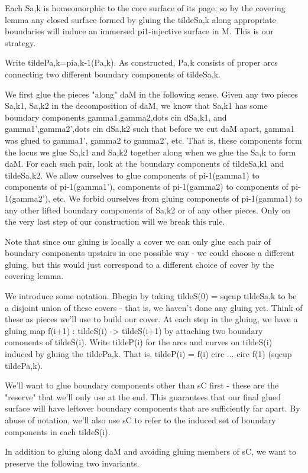\documentclass[12pt]{amsart}
\theoremstyle{definition}
\theoremstyle{remark}
\begin{document}
Each Sa,k is homeomorphic to the core surface of its page, so by the covering
lemma any closed surface formed by gluing the tildeSa,k along appropriate
boundaries will induce an immersed pi1-injective surface in M. This is our
strategy.

Write tildePa,k=pia,k-1(Pa,k). As constructed, Pa,k consists of proper arcs
connecting two different boundary components of tildeSa,k.

We first glue the pieces "along" daM in the following sense. Given any two
pieces Sa,k1, Sa,k2 in the decomposition of daM, we know that Sa,k1 has some
boundary components gamma1,gamma2,dots cin dSa,k1, and gamma1',gamma2',dots cin
dSa,k2 such that before we cut daM apart, gamma1 was glued to gamma1', gamma2
to gamma2', etc.  That is, these components form the locus we glue Sa,k1 and
Sa,k2 together along when we glue the Sa,k to form daM.  For each such pair,
look at the boundary components of tildeSa,k1 and tildeSa,k2.  We allow
ourselves to glue components of pi-1(gamma1) to components of pi-1(gamma1'),
components of pi-1(gamma2) to components of pi-1(gamma2'), etc. We forbid
ourselves from gluing components of pi-1(gamma1) to any other lifted boundary
components of Sa,k2 or of any other pieces. Only on the very last step of our
construction will we break this rule.

Note that since our gluing is locally a cover we can only glue each pair of
boundary components upstairs in one possible way - we could choose a different
gluing, but this would just correspond to a different choice of cover by the
covering lemma.

We introduce some notation. Bbegin by taking tildeS(0) = sqcup tildeSa,k to be
a disjoint union of these covers - that is, we haven't done any gluing yet.
Think of these as pieces we'll use to build our cover. At each step in the
gluing, we have a gluing map f(i+1) : tildeS(i) -> tildeS(i+1) by attaching two
boundary comonents of tildeS(i). Write tildeP(i) for the arcs and curves on
tildeS(i) induced by gluing the tildePa,k.  That is, tildeP(i) = f(i) circ ...
circ f(1) (sqcup tildePa,k).

We'll want to glue boundary components other than sC first - these are the
"reserve" that we'll only use at the end. This guarantees that our final glued
surface will have leftover boundary components that are sufficiently far apart.
By abuse of notation, we'll also use sC to refer to the induced set of boundary
components in each tildeS(i).

In addition to gluing along daM and avoiding gluing members of sC, we want to
preserve the following two invariants.
\end{document}
